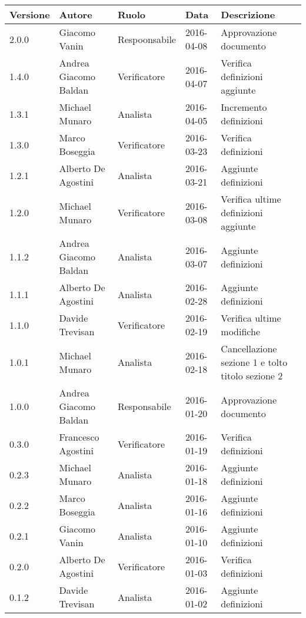 \documentclass{scalatekids-article}
\begin{document}
\vspace{0cm}
\begin{center}
  \begin{tabular}{|l | l | l | l | l |}
    \hline
    Versione & Autore & Ruolo & Data & Descrizione \\
    \hline
    2.0.0 & Giacomo Vanin & Respoonsabile & 2016-04-08 & Approvazione documento\\
    \hline
    1.4.0 & Andrea Giacomo Baldan & Verificatore & 2016-04-07 & Verifica definizioni aggiunte\\
    \hline
    1.3.1 & Michael Munaro & Analista & 2016-04-05 & Incremento definizioni\\
    \hline
    1.3.0 & Marco Boseggia & Verificatore & 2016-03-23 & Verifica definizioni\\
    \hline
    1.2.1 & Alberto De Agostini & Analista & 2016-03-21 & Aggiunte definizioni\\
    \hline
    1.2.0 & Michael Munaro & Verificatore & 2016-03-08 & Verifica ultime definizioni aggiunte\\
    \hline
    1.1.2 & Andrea Giacomo Baldan & Analista & 2016-03-07 & Aggiunte definizioni\\
    \hline
    1.1.1 & Alberto De Agostini & Analista & 2016-02-28 & Aggiunte definizioni\\
    \hline
    1.1.0 & Davide Trevisan & Verificatore & 2016-02-19 & Verifica ultime modifiche\\
    \hline
    1.0.1 & Michael Munaro & Analista & 2016-02-18 & Cancellazione sezione 1 e tolto titolo sezione 2\\
    \hline
    1.0.0 & Andrea Giacomo Baldan & Responsabile & 2016-01-20 & Approvazione documento\\
    \hline
    0.3.0 & Francesco Agostini & Verificatore & 2016-01-19 & Verifica definizioni\\
    \hline
    0.2.3 & Michael Munaro & Analista & 2016-01-18 & Aggiunte definizioni\\
    \hline
    0.2.2 & Marco Boseggia & Analista & 2016-01-16 & Aggiunte definizioni\\
    \hline
    0.2.1 & Giacomo Vanin & Analista & 2016-01-10 & Aggiunte definizioni\\
    \hline
    0.2.0 & Alberto De Agostini & Verificatore & 2016-01-03 & Verifica definizioni\\
    \hline
    0.1.2 & Davide Trevisan & Analista & 2016-01-02 & Aggiunte definizioni\\
    \hline

\end{tabular}
\end{center}
\end{document}
